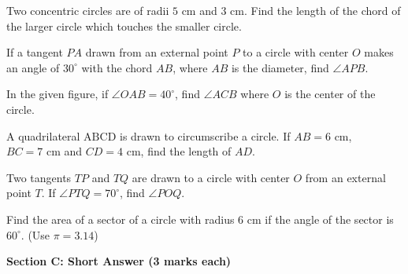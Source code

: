 \documentclass[12pt,a4paper]{exam}
\begin{document}
\begin{questions}
\question[2] Two concentric circles are of radii $5 \text{ cm}$ and $3 \text{ cm}$. Find the length of the chord of the larger circle which touches the smaller circle.
\vspace{0.15cm}

\question[2] If a tangent $PA$ drawn from an external point $P$ to a circle with center $O$ makes an angle of $30^\circ$ with the chord $AB$, where $AB$ is the diameter, find $\angle APB$.
\vspace{0.15cm}

\question[2] In the given figure, if $\angle OAB = 40^\circ$, find $\angle ACB$ where $O$ is the center of the circle.
\vspace{0.15cm}

\question[2] A quadrilateral $\text{ABCD}$ is drawn to circumscribe a circle. If $AB = 6 \text{ cm}$, $BC = 7 \text{ cm}$ and $CD = 4 \text{ cm}$, find the length of $AD$.
\vspace{0.15cm}

\question[2] Two tangents $TP$ and $TQ$ are drawn to a circle with center $O$ from an external point $T$. If $\angle PTQ = 70^\circ$, find $\angle POQ$.
\vspace{0.15cm}

\question[2] Find the area of a sector of a circle with radius $6 \text{ cm}$ if the angle of the sector is $60^\circ$. (Use $\pi = 3.14$)
\vspace{0.15cm}

\end{questions}
\bigskip
\noindent\textbf{\large Section C: Short Answer (3 marks each)}
\end{document}
